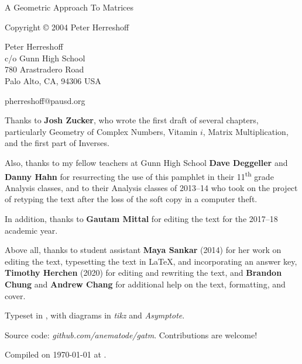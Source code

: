 \documentclass[../gatm.tex]{subfiles}
\begin{document}
\newcommand\dnew{\vspace{1cm}}

\begin{center}
	\vspace*{\fill}

	\doublespacing
	A Geometric Approach To Matrices

	Copyright \copyright{} 2004 Peter Herreshoff  %

	\vspace{1cm}

	Peter Herreshoff\\
	c/o Gunn High School\\
	780 Arastradero Road\\
	Palo Alto, CA, 94306 USA

	\vspace{.5cm}

	pherreshoff@pausd.org %

	\vspace{1cm}
\end{center}

\noindent Thanks to \textbf{Josh Zucker}, who wrote the first draft of several chapters, particularly Geometry of Complex Numbers, Vitamin $i$, Matrix Multiplication, and the first part of Inverses.

\noindent Also, thanks to my fellow teachers at Gunn High School \textbf{Dave Deggeller} and \textbf{Danny Hahn} for resurrecting the use of this pamphlet in their 11\textsuperscript{th} grade Analysis classes, and to their Analysis classes of 2013--14 who took on the project of retyping the text after the loss of the soft copy in a computer theft.

\noindent In addition, thanks to \textbf{Gautam Mittal} for editing the text for the 2017--18 academic year.

\noindent Above all, thanks to student assistant \textbf{Maya Sankar} (2014) for her work on editing the text, typesetting the text in \LaTeX{}, and incorporating an answer key, \textbf{Timothy Herchen} (2020) for editing and rewriting the text, and \textbf{Brandon Chung} and \textbf{Andrew Chang} for additional help on the text, formatting, and cover.

\vspace{0.5cm}

\noindent Typeset in \LaTeXe, with diagrams in \textit{tikz} and \textit{Asymptote}.

\noindent Source code: \textit{github.com/anematode/gatm}. Contributions are welcome!

\noindent Compiled on {\ddmmyyyydate\today} at \currenttime.

\vspace*{\fill}
\end{document}

